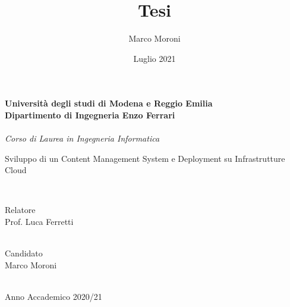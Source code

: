 \documentclass[12pt,a4paper]{article}
\title{Tesi}
\author{Marco Moroni }
\date{Luglio 2021}
\begin{document}
\begin{titlepage}
    \begin{center}
    {
        \large
        \textbf{Università  degli studi di Modena e Reggio Emilia} \\
        \textbf{Dipartimento di Ingegneria Enzo Ferrari} \\
        \hspace*{0cm} \hrulefill \hspace*{0cm} \\
        \emph{Corso di Laurea in Ingegneria Informatica}


        \huge{ Sviluppo di un Content Management System e Deployment su Infrastrutture Cloud }}\\
        \vspace{3mm}

    \end{center}
    \vspace{40mm}
    \par
    \noindent
    \begin{minipage}[t]{0.47\textwidth}
        {\large{ Relatore\\
        Prof.
        Luca Ferretti}}\\
        \\
    \end{minipage}
    \hfill
    \begin{minipage}[t]{0.47\textwidth}\raggedleft
        {\large{ Candidato\\
        Marco Moroni}}
    \end{minipage}
    \vspace{20mm}
    \begin{center}
        \hspace*{0cm} \hrulefill \hspace*{0cm} \\
        {\large{
        Anno Accademico 2020/21}}
    \end{center}

\end{titlepage}

\clearpage
\end{document}
